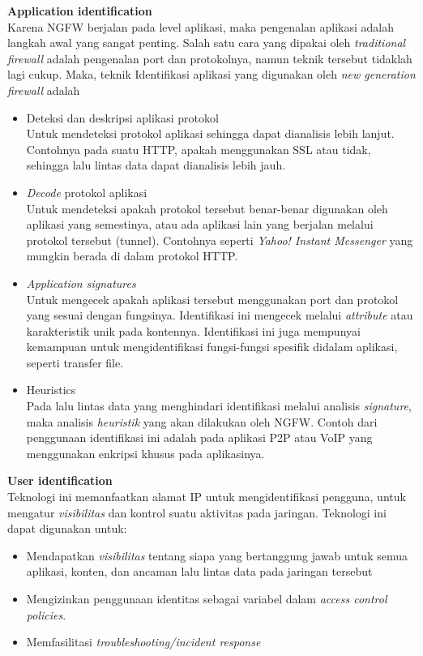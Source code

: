 \noindent\textbf{Application identification}\\
Karena NGFW berjalan pada level aplikasi, maka pengenalan aplikasi adalah langkah awal yang sangat penting. Salah satu cara yang dipakai oleh \textit{traditional firewall} adalah pengenalan port dan protokolnya, namun teknik tersebut tidaklah lagi cukup. Maka, teknik Identifikasi aplikasi yang digunakan oleh \textit{new generation firewall} adalah 
\begin{itemize}
	\item Deteksi dan deskripsi aplikasi protokol\\
	Untuk mendeteksi protokol aplikasi sehingga dapat dianalisis lebih lanjut. Contohnya pada suatu HTTP, apakah menggunakan SSL atau tidak, sehingga lalu lintas data dapat dianalisis lebih jauh. 
	\item \textit{Decode} protokol aplikasi\\
	Untuk mendeteksi apakah protokol tersebut benar-benar digunakan oleh aplikasi yang semestinya, atau  ada aplikasi lain yang berjalan melalui protokol tersebut (tunnel). Contohnya seperti \textit{Yahoo! Instant Messenger} yang mungkin berada di dalam protokol HTTP.
	\item \textit{Application signatures}\\
	Untuk mengecek apakah aplikasi tersebut menggunakan port dan protokol
	yang sesuai dengan fungsinya. Identifikasi ini mengecek melalui \textit{attribute} atau karakteristik unik pada kontennya. Identifikasi ini juga mempunyai kemampuan untuk mengidentifikasi fungsi-fungsi spesifik didalam aplikasi, seperti transfer file.
	\item Heuristics\\
	Pada lalu lintas data yang menghindari identifikasi melalui analisis \textit{signature}, maka analisis \textit{heuristik} yang akan dilakukan oleh NGFW. Contoh dari penggunaan identifikasi ini adalah pada aplikasi P2P atau VoIP yang menggunakan enkripsi khusus pada aplikasinya. 
\end{itemize}

\noindent\textbf{User identification}\\
Teknologi ini memanfaatkan alamat IP untuk mengidentifikasi pengguna, untuk mengatur \textit{visibilitas} dan kontrol suatu aktivitas pada jaringan. Teknologi ini dapat digunakan untuk:
\begin{itemize}
	\item Mendapatkan \textit{visibilitas} tentang siapa yang bertanggung jawab untuk semua aplikasi, konten, dan ancaman lalu lintas data pada jaringan tersebut
	\item Mengizinkan penggunaan identitas sebagai variabel dalam \textit{access control policies}.
	\item Memfasilitasi \textit{troubleshooting/incident response}
\end{itemize}

